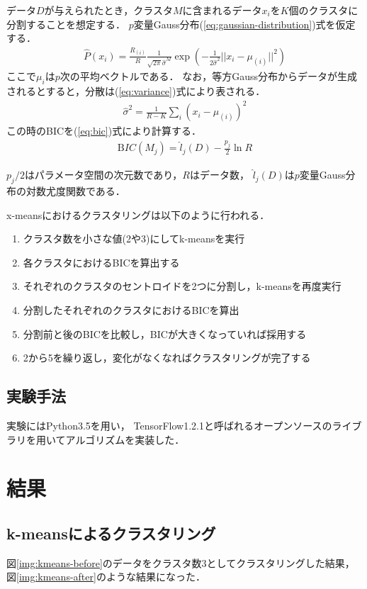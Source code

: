 \documentclass[9pt,a4j,twocolumn]{ltjsarticle}
\def\figref#1{図\ref{#1}}
\def\eqref#1{(\ref{#1})式}
\begin{document}
データ$D$が与えられたとき，クラスタ$M$に含まれるデータ$x_i$を$K$個のクラスタに分割することを想定する．
$p$変量Gauss分布\eqref{eq:gaussian-distribution}を仮定する．
\begin{align}
  \label{eq:gaussian-distribution}
  \hat{P}(x_i) = \frac{R_{(i)}}{R}\frac{1}{\sqrt{2\pi}\hat{\sigma}^M}
    \exp\left(-\frac{1}{2\hat{\sigma}^2}||x_i-\mu_{(i)}||^2\right)
\end{align}
ここで$\mu_{i}$は$p$次の平均ベクトルである．
なお，等方Gauss分布からデータが生成されるとすると，分散は\eqref{eq:variance}により表される．
\begin{align}
  \label{eq:variance}
  \hat{\sigma}^2 = \frac{1}{R-K}\sum_i\left(x_i - \mu_{(i)}\right)^2
\end{align}
この時のBICを\eqref{eq:bic}により計算する．
\begin{align}
  \label{eq:bic}
  {\mathrm BIC}(M_j) = \hat{l}_j(D) - \frac{p_j}{2}\ln R
\end{align}

$p_j/2$はパラメータ空間の次元数であり，$R$はデータ数，
$\hat{l}_j(D)$は$p$変量Gauss分布の対数尤度関数である．

x-meansにおけるクラスタリングは以下のように行われる．
\begin{enumerate}
  \item クラスタ数を小さな値(2や3)にしてk-meansを実行
  \item 各クラスタにおけるBICを算出する
  \item それぞれのクラスタのセントロイドを2つに分割し，k-meansを再度実行
  \item 分割したそれぞれのクラスタにおけるBICを算出
  \item 分割前と後のBICを比較し，BICが大きくなっていれば採用する
  \item 2から5を繰り返し，変化がなくなればクラスタリングが完了する
\end{enumerate}

\subsection{実験手法}
実験にはPython3.5を用い，
TensorFlow1.2.1と呼ばれるオープンソースのライブラリを用いてアルゴリズムを実装した．

\section{結果}
\subsection{k-meansによるクラスタリング}
\figref{img:kmeans-before}のデータをクラスタ数3としてクラスタリングした結果，
\figref{img:kmeans-after}のような結果になった．
\end{document}
